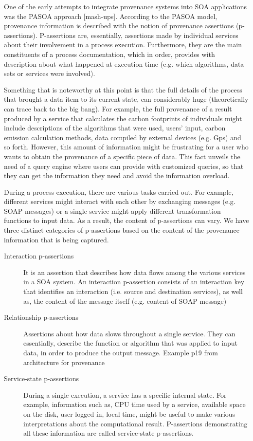 One of the early attempts to integrate provenance systems into SOA applications was the PASOA approach [mash-ups]. According to the PASOA model, provenance information is described with the notion of provenance assertions (p-assertions)\cite{reference9}. P-assertions are, essentially, assertions made by individual services about their involvement in a process execution. Furthermore, they are the main constituents of a process documentation, which in order, provides with description about what happened at execution time (e.g. which algorithms, data sets or services were involved).

Something that is noteworthy at this point is that the full details of the process that brought a data item to its current state, can considerably huge (theoretically can trace back to the big bang\cite{reference1}). For example, the full provenance of a result produced by a service that calculates the carbon footprints of individuals might include descriptions of the algorithms that were used, users' input, carbon emission calculation methods, data compiled by external devices (e.g. Gps) and so forth. However, this amount of information might be frustrating for a user who wants to obtain the provenance of a specific piece of data. This fact unveils the need of a query engine where users can provide with customized queries, so that they can get the information they need and avoid the information overload.

During a process execution, there are various tasks carried out. For example, different services might interact with each other by exchanging messages (e.g. SOAP messages) or a single service might apply different transformation functions to input data. As a result, the content of p-assertions can vary. We have three distinct categories of p-assertions based on the content of the provenance information that is being captured.

\begin{description}
  \item[Interaction p-assertions]
         It is an assertion that describes how data flows among the various services in a SOA system. An interaction p-assertion consists of an interaction key that identifies an interaction (i.e. source and destination services), as well as, the content of the message itself (e.g. content of SOAP message)
  \item[ Relationship p-assertions]
      Assertions about how data slows throughout a single service. They can essentially, describe the function or algorithm that was applied to input data, in order to produce the output message.
       Example p19 from architecture for provenance

  \item[Service-state p-assertions]
        During a single execution, a service has a specific internal state. For example, information such as, CPU time used by a service, available space on the disk, user logged in, local time, might be useful to make various interpretations about the computational result.  P-assertions demonstrating all these information are called service-state p-assertions.
\end{description}

